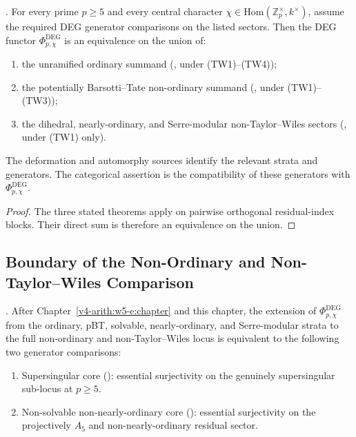 \begin{theorem}
\label{v4-arith:w6-e:thm:f1a1-maximal-uncond}
\ClaimStatusNeedsVerification. For every prime \(p\geq 5\) and every central
character \(\chi\in\mathrm{Hom}(\mathbb{Z}_{p}^{\times},k^{\times})\),
assume the required DEG generator comparisons on the listed sectors.
Then
the DEG functor \(\Phi^{\mathrm{DEG}}_{p,\chi}\) is an equivalence on
the union of:
\begin{enumerate}
\item the unramified ordinary summand (,
under (TW1)--(TW4));
\item the potentially Barsotti--Tate non-ordinary summand
(, under (TW1)--(TW3));
\item the dihedral, nearly-ordinary, and Serre-modular non-Taylor--Wiles
sectors (, under (TW1) only).
\end{enumerate}
The deformation and automorphy sources identify the relevant strata and
generators. The categorical assertion is the compatibility of these
generators with \(\Phi^{\mathrm{DEG}}_{p,\chi}\).
\end{theorem}

\begin{proof}
The three stated theorems apply on pairwise orthogonal
residual-index blocks. Their direct sum is therefore an equivalence on
the union.
\end{proof}

\subsection{Boundary of the Non-Ordinary and Non-Taylor--Wiles Comparison}

\begin{proposition}
\label{v4-arith:w6-e:prop:F1-table-refined}
\ClaimStatusProvedHere. After Chapter~\ref{v4-arith:w5-e:chapter}
and this chapter, the extension of
\(\Phi^{\mathrm{DEG}}_{p,\chi}\) from the ordinary, pBT, solvable,
nearly-ordinary, and Serre-modular strata to the full non-ordinary and
non-Taylor--Wiles locus is equivalent to the following two generator
comparisons:
\begin{enumerate}
\item Supersingular core
(): essential surjectivity
on the genuinely supersingular sub-locus at \(p\geq 5\).
\item Non-solvable non-nearly-ordinary core
(): essential
surjectivity on the projectively \(A_{5}\) and non-nearly-ordinary
residual sector.
\end{enumerate}
\end{proposition}

